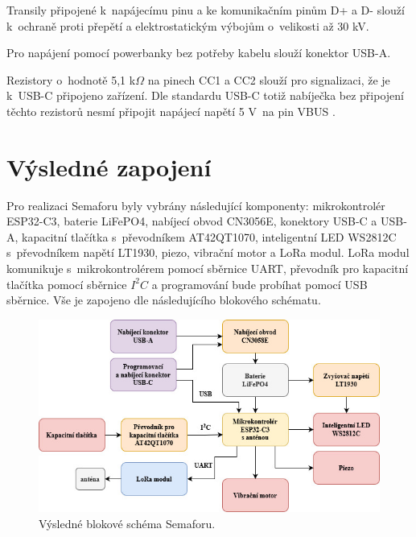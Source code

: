 Transily připojené k~napájecímu pinu a ke komunikačním pinům D+ a D- slouží k~ochraně proti přepětí a elektrostatickým výbojům o~velikosti až 30 kV. 

Pro napájení pomocí powerbanky bez potřeby kabelu slouží konektor USB-A. 

Rezistory o~hodnotě 5,1 k$\Omega$ na pinech CC1 a CC2 slouží pro signalizaci, že je k~USB-C připojeno zařízení. Dle standardu USB-C totiž nabíječka bez 
připojení těchto rezistorů nesmí připojit napájecí napětí 5 V~na pin VBUS \cite{USB-C}. 


\section{Výsledné zapojení}
Pro realizaci Semaforu byly vybrány následující komponenty: mikrokontrolér ESP32-C3, baterie LiFePO4, nabíjecí obvod CN3056E, konektory USB-C a USB-A,
kapacitní tlačítka s~převodníkem AT42QT1070, inteligentní LED WS2812C s~převodníkem napětí LT1930, piezo, vibrační motor a LoRa modul. LoRa modul komunikuje 
s~mikrokontrolérem pomocí sběrnice UART, převodník pro kapacitní tlačítka pomocí sběrnice $I^2C$ a programování bude probíhat pomocí USB sběrnice. Vše je 
zapojeno dle následujícího blokového schématu. 

\begin{figure}[!h]
  \begin{center}
    \includegraphics[scale=0.65]{obrazky/vysledne_blokove_schema.jpg}
  \end{center}
  \caption[Výsledné blokové schéma Semaforu]{Výsledné blokové schéma Semaforu.}
\end{figure}





